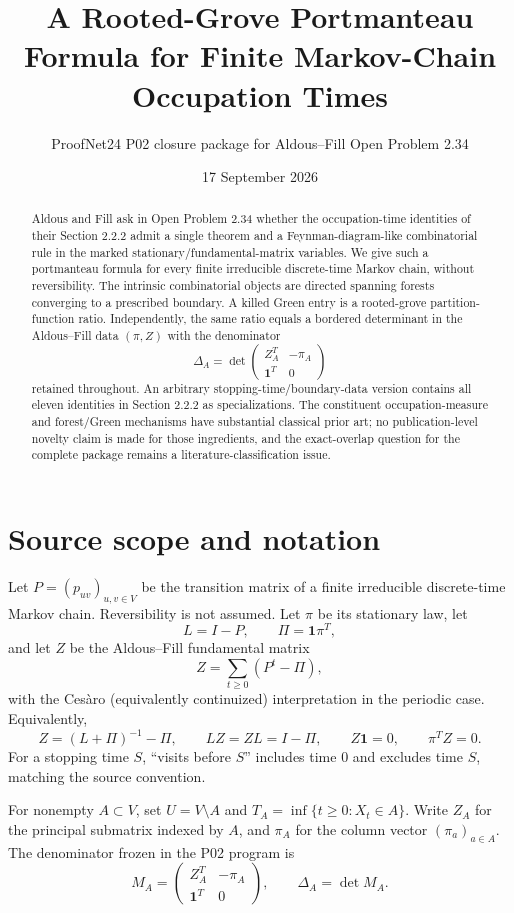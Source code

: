 \documentclass[11pt]{article}
\title{A Rooted-Grove Portmanteau Formula for Finite Markov-Chain Occupation Times}
\author{ProofNet24 P02 closure package for Aldous--Fill Open Problem 2.34}
\date{17 September 2026}
\newcommand{\one}{\mathbf 1}
\begin{document}
\maketitle

\begin{abstract}
Aldous and Fill ask in Open Problem 2.34 whether the occupation-time identities of their Section 2.2.2 admit a single theorem and a Feynman-diagram-like combinatorial rule in the marked stationary/fundamental-matrix variables.  We give such a portmanteau formula for every finite irreducible discrete-time Markov chain, without reversibility.  The intrinsic combinatorial objects are directed spanning forests converging to a prescribed boundary.  A killed Green entry is a rooted-grove partition-function ratio.  Independently, the same ratio equals a bordered determinant in the Aldous--Fill data $(\pi,Z)$ with the denominator
\[
\Delta_A=\det\begin{pmatrix}Z_A^T&-\pi_A\\ \one^T&0\end{pmatrix}
\]
retained throughout.  An arbitrary stopping-time/boundary-data version contains all eleven identities in Section 2.2.2 as specializations.  The constituent occupation-measure and forest/Green mechanisms have substantial classical prior art; no publication-level novelty claim is made for those ingredients, and the exact-overlap question for the complete package remains a literature-classification issue.
\end{abstract}

\section{Source scope and notation}
Let $P=(p_{uv})_{u,v\in V}$ be the transition matrix of a finite irreducible discrete-time Markov chain.  Reversibility is not assumed.  Let $\pi$ be its stationary law, let
\[
L=I-P,\qquad \Pi=\one\pi^T,
\]
and let $Z$ be the Aldous--Fill fundamental matrix
\[
Z=\sum_{t\ge0}(P^t-\Pi),
\]
with the Ces\`aro (equivalently continuized) interpretation in the periodic case.  Equivalently,
\[
Z=(L+\Pi)^{-1}-\Pi,
\qquad LZ=ZL=I-\Pi,
\qquad Z\one=0,
\qquad \pi^TZ=0.
\]
For a stopping time $S$, ``visits before $S$'' includes time $0$ and excludes time $S$, matching the source convention.

For nonempty $A\subset V$, set $U=V\setminus A$ and $T_A=\inf\{t\ge0:X_t\in A\}$.  Write $Z_A$ for the principal submatrix indexed by $A$, and $\pi_A$ for the column vector $(\pi_a)_{a\in A}$.  The denominator frozen in the P02 program is
\begin{equation}
M_A=\begin{pmatrix}Z_A^T&-\pi_A\\ \one^T&0\end{pmatrix},
\qquad
\Delta_A=\det M_A.
\tag{1.1}
\end{equation}
\end{document}
